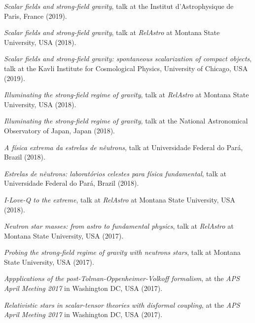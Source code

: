 \documentclass[10pt]{article}
\newcommand{\invited}{{\color{aeilbl}{invited}}}
\begin{document}
\begin{bibenum}
    \item
    \emph{Scalar fields and strong-field gravity},
    \invited{} talk at the Institut d'Astrophysique de Paris, France (2019).

    \item
    \emph{Scalar fields and strong-field gravity},
    talk at \emph{RelAstro} at Montana State University, USA (2018).

	\item
    \emph{Scalar fields and strong-field gravity: spontaneous scalarization of compact objects},
    \invited{} talk at the Kavli Institute for Cosmological Physics, University of Chicago, USA (2019).

    \item
    \emph{Illuminating the strong-field regime of gravity},
    talk at \emph{RelAstro} at Montana State University, USA (2018).

	\item
    \emph{Illuminating the strong-field regime of gravity},
    \invited{} talk at the National Astronomical Observatory of Japan, Japan (2018).

    \item
    \emph{A f\'isica extrema da estrelas de n\^eutrons},
    \invited{} talk at Universidade Federal do Par\'a, Brazil (2018).

    \item
    \emph{Estrelas de n\^eutrons: laborat\'orios celestes para f\'isica fundamental},
    \invited{} talk at Universidade Federal do Par\'a, Brazil (2018).

    \item
    \emph{I-Love-Q to the extreme},
    talk at \emph{RelAstro} at Montana State University, USA (2018).

    \item
    \emph{Neutron star masses: from astro to fundamental physics},
    talk at \emph{RelAstro} at Montana State University, USA (2017).

    \item
    \emph{Probing the strong-field regime of gravity with neutrons stars},
    \invited{} talk at Montana State University, USA (2017).

    \item
    \emph{Appplications of the post-Tolman-Oppenheimer-Volkoff formalism},
    at the \emph{APS April Meeting 2017}
    in Washington DC, USA (2017).

    \item
    \emph{Relativistic stars in scalar-tensor theories with disformal coupling},
    at the \emph{APS April Meeting 2017}
    in Washington DC, USA (2017).


\end{bibenum}
\end{document}
